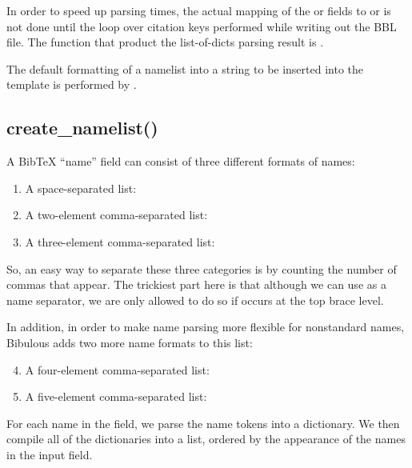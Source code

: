 \documentclass[letterpaper,10pt,english]{sphinxmanual}
\begin{document}
In order to speed up parsing times, the actual mapping of the  or  fields to  or  is not done until the loop over citation keys performed while writing out the BBL file. The function that product the list-of-dicts parsing result is .

The default formatting of a namelist into a string to be inserted into the template is performed by .


\subsection{create\_namelist()}
\label{developer_guide:create-namelist}
A BibTeX ``name'' field can consist of three different formats of names:
\begin{enumerate}
\item {} 
A space-separated list: 

\item {} 
A two-element comma-separated list: 

\item {} 
A three-element comma-separated list: 

\end{enumerate}

So, an easy way to separate these three categories is by counting the number of commas that appear. The trickiest part here is that although we can use  as a name separator, we are only allowed to do so if  occurs at the top brace level.

In addition, in order to make name parsing more flexible for nonstandard names, Bibulous adds two more name formats to this list:
\begin{enumerate}
\setcounter{enumi}{3}
\item {} 
A four-element comma-separated list: 

\item {} 
A five-element comma-separated list: 

\end{enumerate}

For each name in the field, we parse the name tokens into a dictionary. We then compile all of the dictionaries into a list, ordered by the appearance of the names in the input field.
\end{document}
